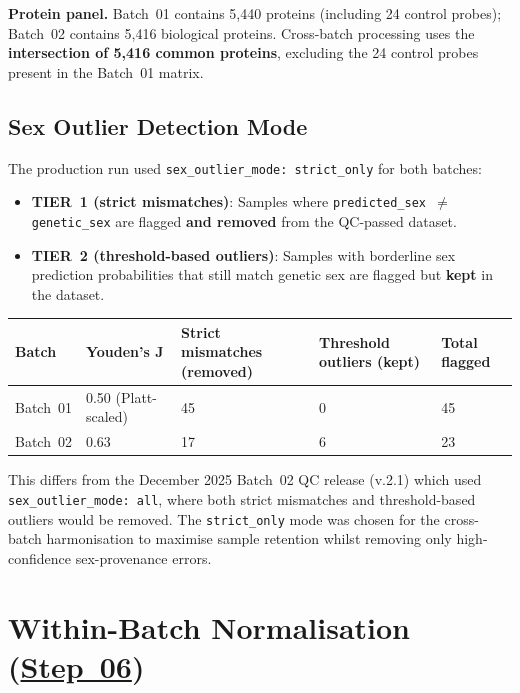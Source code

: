 \documentclass[11pt,a4paper]{article}
\begin{document}
\textbf{Protein panel.}\enspace
Batch~01 contains 5,440 proteins (including 24 control probes); Batch~02
contains 5,416 biological proteins. Cross-batch processing uses the
\textbf{intersection of 5,416 common proteins}, excluding the 24 control
probes present in the Batch~01 matrix.

\subsection{Sex Outlier Detection Mode}

The production run used \texttt{sex\_outlier\_mode:\allowbreak\ strict\_only}
for both batches:

\begin{itemize}
  \item \textbf{TIER~1 (strict mismatches)}: Samples where
        \texttt{predicted\_sex $\neq$ genetic\_sex} are flagged \textbf{and
        removed} from the QC-passed dataset.
  \item \textbf{TIER~2 (threshold-based outliers)}: Samples with borderline
        sex prediction probabilities that still match genetic sex are flagged
        but \textbf{kept} in the dataset.
\end{itemize}

{\footnotesize
\renewcommand{\arraystretch}{1.2}
\begin{longtable}{p{1.8cm}p{2.8cm}p{3.2cm}p{2.8cm}p{1.8cm}}
\toprule
\textbf{Batch} & \textbf{Youden's J} & \textbf{Strict mismatches (removed)}
  & \textbf{Threshold outliers (kept)} & \textbf{Total flagged} \\
\midrule
Batch~01 & 0.50 (Platt-scaled) & 45 & 0 & 45 \\
Batch~02 & 0.63 & 17 & 6 & 23 \\
\bottomrule
\end{longtable}
\renewcommand{\arraystretch}{1.0}
}

This differs from the December 2025 Batch~02 QC release (v.2.1) which used
\texttt{sex\_outlier\_mode: all}, where both strict mismatches and
threshold-based outliers would be removed. The \texttt{strict\_only} mode
was chosen for the cross-batch harmonisation to maximise sample retention
whilst removing only high-confidence sex-provenance errors.

\section{Within-Batch Normalisation (\href{https://github.com/FINNGEN/FinnGen3-proteomics-pipeline#pipeline-steps}{Step~06})}
\end{document}

